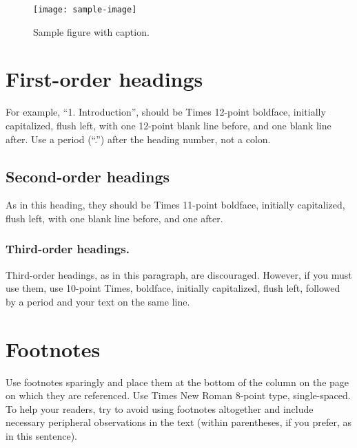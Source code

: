 \documentclass[10pt]{article}
\begin{document}
\begin{figure}[thb]
    \centering
	\texttt{[image: sample-image]}
	\caption{Sample figure with caption.}
	\label{fig: sample-figure}       %
\end{figure}

\section{First-order headings}

For example, “1. Introduction”, should be Times 12-point boldface, initially capitalized, flush left, with one 12-point blank line before, and one blank line after. Use a period (“.”) after the heading number, not a colon. 

\subsection{Second-order headings}
 
As in this heading, they should be Times 11-point boldface, initially capitalized, flush left, with one blank line before, and one after. 

\subsubsection{Third-order headings. }

Third-order headings, as in this paragraph, are discouraged. However, if you must use them, use 10-point Times, boldface, initially capitalized, flush left, followed by a period and your text on the same line. 

\section{Footnotes}

      Use footnotes sparingly and place them at the bottom of the column on the page on which they are referenced. Use Times New Roman 8-point type, single-spaced. To help your readers, try to avoid using footnotes altogether and include necessary peripheral observations in the text (within parentheses, if you prefer, as in this sentence). 

\end{document}
